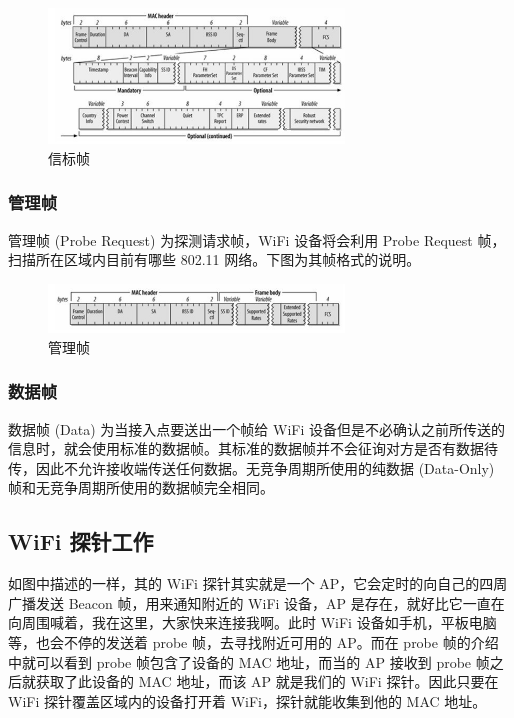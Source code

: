 \begin{figure}[htb]
\centering 
\includegraphics[width=0.70\textwidth]{img/ch1s5m3.jpg} 
\caption{信标帧}
\label{Test}
\end{figure}


\subsubsection{管理帧}

管理帧 (Probe Request) 为探测请求帧，WiFi 设备将会利用 Probe Request 帧，扫描所在区域内目前有哪些 802.11 网络。下图为其帧格式的说明。

\begin{figure}[htb]
\centering 
\includegraphics[width=0.70\textwidth]{img/ch1s5m4.jpg} 
\caption{管理帧}
\label{Test}
\end{figure}

\subsubsection{数据帧}

数据帧 (Data) 为当接入点要送出一个帧给 WiFi 设备但是不必确认之前所传送的信息时，就会使用标准的数据帧。其标准的数据帧并不会征询对方是否有数据待传，因此不允许接收端传送任何数据。无竞争周期所使用的纯数据 (Data-Only) 帧和无竞争周期所使用的数据帧完全相同。

\subsection{WiFi 探针工作}

如图中描述的一样，其的 WiFi 探针其实就是一个 AP，它会定时的向自己的四周广播发送 Beacon 帧，用来通知附近的 WiFi 设备，AP 是存在，就好比它一直在向周围喊着，我在这里，大家快来连接我啊。此时 WiFi 设备如手机，平板电脑等，也会不停的发送着 probe 帧，去寻找附近可用的 AP。而在 probe 帧的介绍中就可以看到 probe 帧包含了设备的 MAC 地址，而当的 AP 接收到 probe 帧之后就获取了此设备的 MAC 地址，而该 AP 就是我们的 WiFi 探针。因此只要在 WiFi 探针覆盖区域内的设备打开着 WiFi，探针就能收集到他的 MAC 地址。

